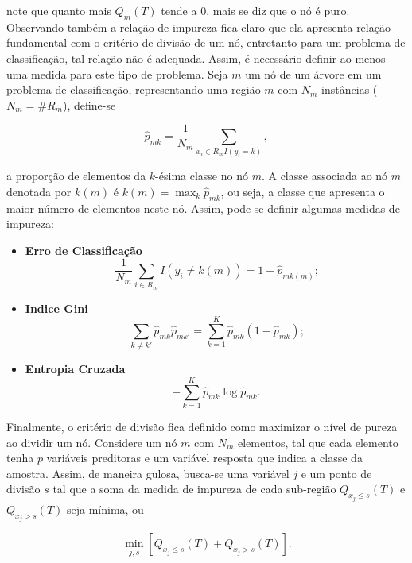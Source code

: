 note que quanto mais $Q_m(T)$ tende a $0$, mais se diz que o nó é puro. Observando também a relação de impureza fica claro que ela apresenta relação fundamental com o critério de divisão de um nó, entretanto para um problema de classificação, tal relação não é adequada. Assim, é necessário definir ao menos uma medida para este tipo de problema. Seja $m$ um nó de um árvore em um problema de classificação, representando uma região $m$ com $N_m$ instâncias ($N_m=\#R_m$), define-se

\begin{equation}
\hat{p}_{mk}=\frac{1}{N_m}\sum_{x_i\in{R_m}I(y_i=k)}\mbox{,}~
\end{equation}

a proporção de elementos da $k$-ésima classe no nó $m$. A classe associada ao nó $m$ denotada por $k(m)$ é $k(m)=\max_k\hat{p}_{mk}$, ou seja, a classe que apresenta o maior número de elementos neste nó. Assim, pode-se definir algumas medidas de impureza:

\begin{itemize}
\item {\bf Erro de Classificação}
\begin{equation}
\frac{1}{N_m}\sum_{i\in{R_m}}I(y_i\neq{k}(m))=1-\hat{p}_{mk(m)}\mbox{;}
\end{equation}
\item {\bf Indice Gini}
\begin{equation}
\sum_{k\neq{k}'}\hat{p}_{mk}\hat{p}_{mk'}=\sum_{k=1}^{K}\hat{p}_{mk}(1-\hat{p}_{mk})\mbox{;}
\end{equation}
\item {\bf Entropia Cruzada}
\begin{equation}
-\sum_{k=1}^K\hat{p}_{mk}\log\hat{p}_{mk}\mbox{.}
\end{equation}
\end{itemize}

Finalmente, o critério de divisão fica definido como maximizar o nível de pureza ao dividir um nó. Considere um nó $m$ com $N_m$ elementos, tal que cada elemento tenha $p$ variáveis preditoras e um variável resposta que indica a classe da amostra. Assim, de maneira gulosa, busca-se uma variável $j$ e um ponto de divisão $s$ tal que a soma da medida de impureza de cada sub-região $Q_{x_j\le{s}}(T)$ e $Q_{x_j>{s}}(T)$ seja mínima, ou

\begin{equation}
\min_{j,s}\left[Q_{x_j\le{s}}(T)+Q_{x_j>{s}}(T)\right]\mbox{.}
\end{equation}

